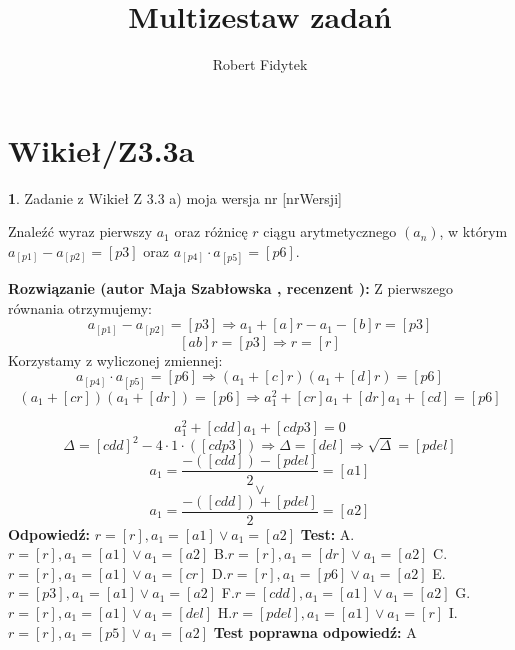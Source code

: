 \documentclass[12pt, a4paper]{article}
\title{Multizestaw zadań}
\author{Robert Fidytek}
\date{}
\theoremstyle{definition} %
\newtheorem{zad}{}
\newcommand{\kategoria}[1]{\section{#1}} %
\newcommand{\zadStart}[1]{\begin{zad}#1\newline} %
\newcommand{\zadStop}{\end{zad}}   %
\newcommand{\rozwStart}[2]{\noindent \textbf{Rozwiązanie (autor #1 , recenzent #2): }\newline} %
\newcommand{\rozwStop}{\newline}                                            %
\newcommand{\odpStart}{\noindent \textbf{Odpowiedź:}\newline}    %
\newcommand{\odpStop}{\newline}                                             %
\newcommand{\testStart}{\noindent \textbf{Test:}\newline} %
\newcommand{\testStop}{\newline} %
\newcommand{\kluczStart}{\noindent \textbf{Test poprawna odpowiedź:}\newline} %
\newcommand{\kluczStop}{\newline} %
\begin{document}
\maketitle


\kategoria{Wikieł/Z3.3a}
\zadStart{Zadanie z Wikieł Z 3.3 a)  moja wersja nr [nrWersji]}


Znaleźć wyraz pierwszy $a_{1}$ oraz różnicę $r$ ciągu arytmetycznego $(a_{n})$, w którym $a_{[p1]}-a_{[p2]}=[p3]$ oraz $a_{[p4]}\cdot a_{[p5]}=[p6].$
\zadStop
\rozwStart{Maja Szabłowska}{}
Z pierwszego równania otrzymujemy:
$$a_{[p1]}-a_{[p2]}=[p3] \Rightarrow a_{1}+[a]r-a_{1}-[b]r=[p3]$$
$$[ab]r=[p3] \Rightarrow r=[r]$$
Korzystamy z wyliczonej zmiennej:
$$a_{[p4]}\cdot a_{[p5]}=[p6] \Rightarrow (a_{1}+[c]r)(a_{1}+[d]r)=[p6] $$
$$(a_{1}+[cr])(a_{1}+[dr])=[p6] \Rightarrow a_{1}^{2}+[cr]a_{1}+[dr]a_{1}+[cd]=[p6] $$

$$a_{1}^{2}+[cdd]a_{1}+[cdp3]=0 $$
$$\Delta=[cdd]^{2}-4\cdot1\cdot([cdp3]) \Rightarrow \Delta=[del] \Rightarrow \sqrt{\Delta}=[pdel]$$
$$a_{1}=\frac{-([cdd])-[pdel]}{2}=[a1]$$ $$\lor$$ $$ a_{1}=\frac{-([cdd])+[pdel]}{2}=[a2] $$
\rozwStop
\odpStart
$r=[r], a_{1}=[a1] \lor a_{1}=[a2]$
\odpStop
\testStart
A.$r=[r], a_{1}=[a1] \lor a_{1}=[a2]$
B.$r=[r], a_{1}=[dr] \lor a_{1}=[a2]$
C.$r=[r], a_{1}=[a1] \lor a_{1}=[cr]$
D.$r=[r], a_{1}=[p6] \lor a_{1}=[a2]$
E.$r=[p3], a_{1}=[a1] \lor a_{1}=[a2]$
F.$r=[cdd], a_{1}=[a1] \lor a_{1}=[a2]$
G.$r=[r], a_{1}=[a1] \lor a_{1}=[del]$
H.$r=[pdel], a_{1}=[a1] \lor a_{1}=[r]$
I.$r=[r], a_{1}=[p5] \lor a_{1}=[a2]$
\testStop
\kluczStart
A
\kluczStop
\end{document}
